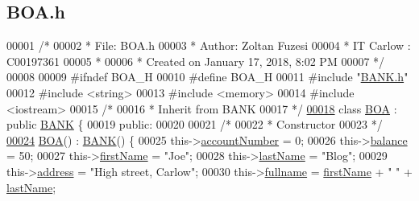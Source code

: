 \hypertarget{_b_o_a_8h_source}{}\subsection{B\+O\+A.\+h}

\begin{DoxyCode}
00001 \textcolor{comment}{/* }
00002 \textcolor{comment}{ * File:   BOA.h}
00003 \textcolor{comment}{ * Author: Zoltan Fuzesi}
00004 \textcolor{comment}{ * IT Carlow : C00197361}
00005 \textcolor{comment}{ *}
00006 \textcolor{comment}{ * Created on January 17, 2018, 8:02 PM}
00007 \textcolor{comment}{ */}
00008 
00009 \textcolor{preprocessor}{#ifndef BOA\_H}
00010 \textcolor{preprocessor}{#define BOA\_H}
00011 \textcolor{preprocessor}{#include "\hyperlink{_b_a_n_k_8h}{BANK.h}"}
00012 \textcolor{preprocessor}{#include <string>}
00013 \textcolor{preprocessor}{#include <memory>}
00014 \textcolor{preprocessor}{#include <iostream>}
00015 \textcolor{comment}{/*}
00016 \textcolor{comment}{ * Inherit from BANK}
00017 \textcolor{comment}{ */}
\hypertarget{_b_o_a_8h_source.tex_l00018}{}\hyperlink{class_b_o_a}{00018} \textcolor{keyword}{class }\hyperlink{class_b_o_a}{BOA} : \textcolor{keyword}{public} \hyperlink{class_b_a_n_k}{BANK} \{
00019 \textcolor{keyword}{public}:
00020 
00021     \textcolor{comment}{/*}
00022 \textcolor{comment}{     * Constructor}
00023 \textcolor{comment}{     */}
\hypertarget{_b_o_a_8h_source.tex_l00024}{}\hyperlink{class_b_o_a_ad42dc670d422172c9bcf9b3d354c8a3c_ad42dc670d422172c9bcf9b3d354c8a3c}{00024}     \hyperlink{class_b_o_a_ad42dc670d422172c9bcf9b3d354c8a3c_ad42dc670d422172c9bcf9b3d354c8a3c}{BOA}() : \hyperlink{class_b_a_n_k}{BANK}() \{
00025         this->\hyperlink{class_b_o_a_a86ca4ad716db205f04c337b39b34d9ba_a86ca4ad716db205f04c337b39b34d9ba}{accountNumber} = 0;
00026         this->\hyperlink{class_b_o_a_a2061c36a15924de9186ec5c83dc7da2f_a2061c36a15924de9186ec5c83dc7da2f}{balance} = 50;
00027         this->\hyperlink{class_b_o_a_acb1b3b2a69e403c4e0e3fb08fdbb52a0_acb1b3b2a69e403c4e0e3fb08fdbb52a0}{firstName} = \textcolor{stringliteral}{"Joe"};
00028         this->\hyperlink{class_b_o_a_ab7749e6e945beaca57a3ef01259c6fea_ab7749e6e945beaca57a3ef01259c6fea}{lastName} = \textcolor{stringliteral}{"Blog"};
00029         this->\hyperlink{class_b_o_a_afb2d7d0c5c05169a72bbc6f1d2cc737f_afb2d7d0c5c05169a72bbc6f1d2cc737f}{address} = \textcolor{stringliteral}{"High street, Carlow"};
00030         this->\hyperlink{class_b_o_a_aed3225e383c08b1b7c962a0e43b180d1_aed3225e383c08b1b7c962a0e43b180d1}{fullname} = \hyperlink{class_b_o_a_acb1b3b2a69e403c4e0e3fb08fdbb52a0_acb1b3b2a69e403c4e0e3fb08fdbb52a0}{firstName} + \textcolor{stringliteral}{" "} + \hyperlink{class_b_o_a_ab7749e6e945beaca57a3ef01259c6fea_ab7749e6e945beaca57a3ef01259c6fea}{lastName};

\end{DoxyCode}
